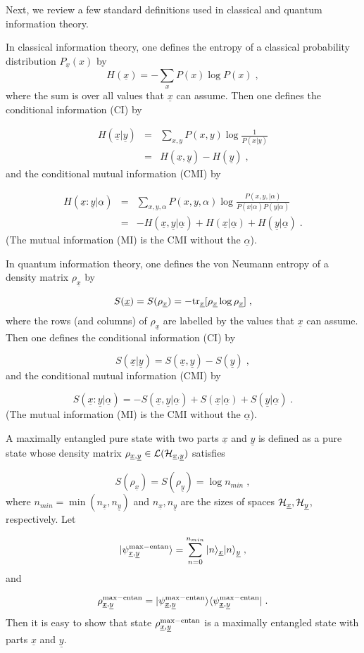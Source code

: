 \documentclass[12pt]{article}%
\newcommand{\bra}[1]{\langle#1|}
\newcommand{\ket}[1]{|#1\rangle}
\newcommand{\tr}[0]{{\rm tr }}
\newcommand{\beq}{\begin{equation}}
\newcommand{\eeq}{\end{equation}}
\newcommand{\beqa}{\begin{eqnarray}}
\newcommand{\eeqa}{\end{eqnarray}}
\newcommand{\ul}[1]{\underline{#1}}
\newcommand{\rvx}[0]{{\ul{x}}}
\newcommand{\rvy}[0]{{\ul{y}}}
\newcommand{\calh}[0]{{\cal H}}
\newcommand{\call}[0]{{\cal L}}
\newcommand{\rvalp}[0]{{\ul{\alpha}}}
\newcommand{\alp}[0]{{\alpha}}
\begin{document}
Next, we review a few standard definitions
used in classical and quantum
information theory.

In
classical information theory, one defines
the entropy of a classical
probability distribution $P_\rvx(x)$ by
\beq
H(\rvx) = -\sum_x P(x)\log P(x)
\;,
\eeq
where the sum is over all values that $\rvx$
can assume.
Then one defines the conditional information (CI) by

\beqa
H(\rvx|\rvy) &=&\sum_{x, y}
P(x, y) \log \frac{ 1}{P(x|y)}
\\
&=&
H(\rvx, \rvy)
-
H(\rvy)
\;,
\eeqa
and the conditional mutual information (CMI) by

\beqa
H(\rvx:\rvy|\rvalp) &=&\sum_{x, y, \alp}
P(x, y, \alp) \log \frac{ P(x, y,| \alp)}{P(x|\alp)P(y|\alp)}
\\
&=&
-H(\rvx, \rvy| \rvalp)
+
H(\rvx| \rvalp)
+
H(\rvy| \rvalp)
\;.
\eeqa
(The mutual information (MI) is the CMI without the $\rvalp$).

In quantum information theory, one defines
the von Neumann entropy of a density matrix $\rho_\rvx$
by

\beq
S(\rvx) = S(\rho_\rvx) =
-\tr_\rvx [\rho_\rvx \log \rho_\rvx]
\;,
\eeq
where the rows (and columns) of $\rho_\rvx$
are labelled by the  values that $\rvx$ can assume.
Then one defines the conditional information (CI) by

\beq
S(\rvx|\rvy) = S(\rvx, \rvy) - S(\rvy)
\;,
\eeq
and the conditional mutual information (CMI) by

\beq
S(\rvx : \rvy | \rvalp)=
-S(\rvx, \rvy| \rvalp)
+
S(\rvx| \rvalp)
+
S(\rvy| \rvalp)
\;.
\eeq
(The mutual information (MI) is the CMI without the $\rvalp$).


A maximally entangled pure state with two parts $\rvx$ and $\rvy$
is defined as a pure state whose density matrix $\rho_{\rvx,\rvy}\in \call({\calh_{\rvx, \rvy}})$
satisfies

\beq
S(\rho_\rvx)=S(\rho_\rvy)= \log n_{min}
\;,
\eeq
where $n_{min}=\min(n_\rvx, n_\rvy)$ and $n_\rvx, n_\rvy$
are the sizes of spaces $\calh_\rvx, \calh_\rvy$, respectively.
Let

\beq
\ket{\psi^{\rm max-entan}_{\rvx, \rvy}}=
\sum_{n=0}^{n_{min}}\ket{n}_\rvx\ket{n}_\rvy
\;,
\eeq
and

\beq
\rho^{\rm max-entan}_{\rvx, \rvy}=
\ket{\psi^{\rm max-entan}_{\rvx, \rvy}}
\bra{\psi^{\rm max-entan}_{\rvx, \rvy}}
\;.
\eeq
Then it is easy to show that
state $\rho^{\rm max-entan}_{\rvx, \rvy}$
is a maximally entangled state
with parts $\rvx$ and $\rvy$.
\end{document}
